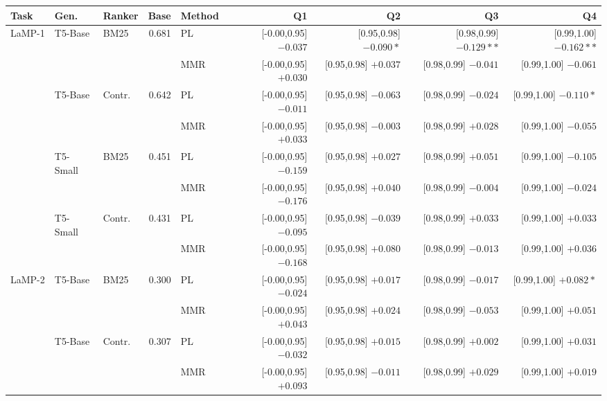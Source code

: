 \documentclass[10pt]{article}
\begin{document}
\begin{table}[p]
\centering
\tiny
\begin{tabular}{@{}lllrlrrrr@{}}
\toprule
Task & Gen. & Ranker & Base & Method & Q1 & Q2 & Q3 & Q4 \\
\midrule
\multirow{2}{*}{LaMP-1} & \multirow{2}{*}{T5-Base} & \multirow{2}{*}{BM25} & \multirow{2}{*}{0.681} & PL & [-0.00,0.95] $-0.037$ & [0.95,0.98] $-0.090*$ & [0.98,0.99] $-0.129**$ & [0.99,1.00] $-0.162**$ \\
 &  &  &  & MMR & [-0.00,0.95] $+0.030$ & [0.95,0.98] $+0.037$ & [0.98,0.99] $-0.041$ & [0.99,1.00] $-0.061$ \\
\cmidrule(lr){1-9}
 & \multirow{2}{*}{T5-Base} & \multirow{2}{*}{Contr.} & \multirow{2}{*}{0.642} & PL & [-0.00,0.95] $-0.011$ & [0.95,0.98] $-0.063$ & [0.98,0.99] $-0.024$ & [0.99,1.00] $-0.110*$ \\
 &  &  &  & MMR & [-0.00,0.95] $+0.033$ & [0.95,0.98] $-0.003$ & [0.98,0.99] $+0.028$ & [0.99,1.00] $-0.055$ \\
\cmidrule(lr){1-9}
 & \multirow{2}{*}{T5-Small} & \multirow{2}{*}{BM25} & \multirow{2}{*}{0.451} & PL & [-0.00,0.95] $-0.159$ & [0.95,0.98] $+0.027$ & [0.98,0.99] $+0.051$ & [0.99,1.00] $-0.105$ \\
 &  &  &  & MMR & [-0.00,0.95] $-0.176$ & [0.95,0.98] $+0.040$ & [0.98,0.99] $-0.004$ & [0.99,1.00] $-0.024$ \\
\cmidrule(lr){1-9}
 & \multirow{2}{*}{T5-Small} & \multirow{2}{*}{Contr.} & \multirow{2}{*}{0.431} & PL & [-0.00,0.95] $-0.095$ & [0.95,0.98] $-0.039$ & [0.98,0.99] $+0.033$ & [0.99,1.00] $+0.033$ \\
 &  &  &  & MMR & [-0.00,0.95] $-0.168$ & [0.95,0.98] $+0.080$ & [0.98,0.99] $-0.013$ & [0.99,1.00] $+0.036$ \\
\midrule
\multirow{2}{*}{LaMP-2} & \multirow{2}{*}{T5-Base} & \multirow{2}{*}{BM25} & \multirow{2}{*}{0.300} & PL & [-0.00,0.95] $-0.024$ & [0.95,0.98] $+0.017$ & [0.98,0.99] $-0.017$ & [0.99,1.00] $+0.082*$ \\
 &  &  &  & MMR & [-0.00,0.95] $+0.043$ & [0.95,0.98] $+0.024$ & [0.98,0.99] $-0.053$ & [0.99,1.00] $+0.051$ \\
\cmidrule(lr){1-9}
 & \multirow{2}{*}{T5-Base} & \multirow{2}{*}{Contr.} & \multirow{2}{*}{0.307} & PL & [-0.00,0.95] $-0.032$ & [0.95,0.98] $+0.015$ & [0.98,0.99] $+0.002$ & [0.99,1.00] $+0.031$ \\
 &  &  &  & MMR & [-0.00,0.95] $+0.093$ & [0.95,0.98] $-0.011$ & [0.98,0.99] $+0.029$ & [0.99,1.00] $+0.019$ \\

\end{tabular}
\end{table}
\end{document}

